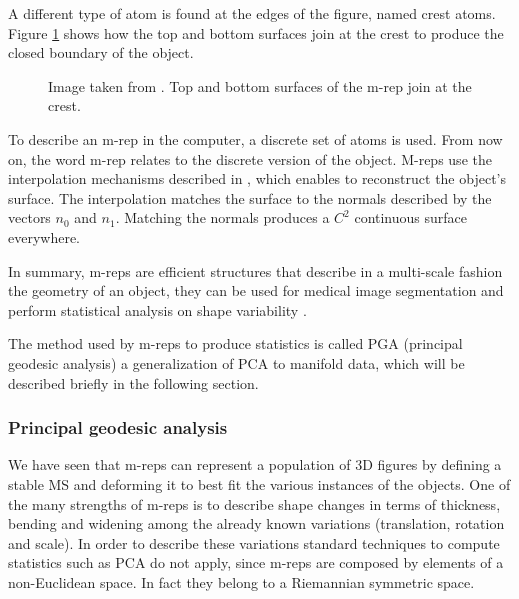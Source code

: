 A different type of atom is found at the edges of the figure, named crest atoms.
Figure \ref{fig:crestAtom} shows how the top and bottom surfaces join 
at the crest to produce the closed boundary of the object. 

\begin{figure} 
 \centering  
 \caption[Top, bottom and crest surfaces.]{Image taken from \cite{pizer2003deformable}. Top and bottom surfaces of the m-rep join at the crest.}
 \label{fig:crestAtom}  
\end{figure}

To describe an m-rep in the computer, 
a discrete set of atoms is used.
From now on, the word m-rep relates to the discrete version of the object. 
M-reps use the interpolation mechanisms described in \cite{thall2004deformable}, 
which enables to reconstruct the object's surface.
The interpolation matches the surface 
to the normals described by the vectors $n_0$ and $n_1$.
Matching the normals produces a $C^2$ continuous surface everywhere. 

In summary, m-reps are efficient structures 
that describe in a multi-scale fashion the geometry
of an object, they can be used 
for medical image segmentation \cite{pizer2005method} and perform 
statistical analysis on shape variability \cite{fletcher2004principal}. 

The method used by m-reps to produce statistics is called PGA (principal geodesic analysis)
a generalization of PCA to manifold data, which will be described briefly in the 
following section.

\subsubsection{Principal geodesic analysis}

We have seen that m-reps can represent a population of 3D figures
by defining a stable MS and deforming it to best fit 
the various instances of the objects.
One of the many strengths of m-reps is to describe 
shape changes in terms of thickness, bending and widening 
among the already known variations (translation, rotation and scale).
In order to describe these variations 
standard techniques to compute statistics such as PCA do not apply, 
since m-reps are composed by elements of a non-Euclidean space.
In fact they belong to a Riemannian symmetric space.

